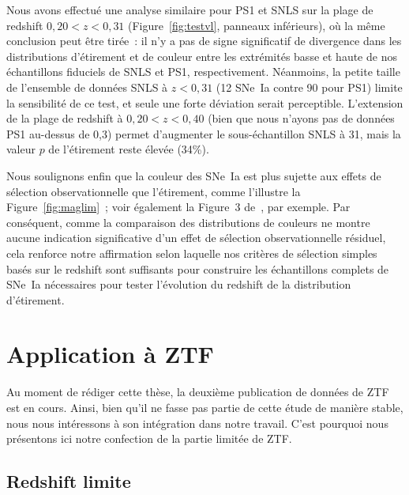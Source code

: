 \documentclass[../main/main.tex]{subfiles}
\begin{document}
Nous avons effectué une analyse similaire pour PS1 et SNLS sur la plage de
redshift $0,20 < z < 0,31$ (Figure~\ref{fig:testvl}, panneaux inférieurs), où la
même conclusion peut être tirée~: il n'y a pas de signe significatif de
divergence dans les distributions d'étirement et de couleur entre les extrémités
basse et haute de nos échantillons fiduciels de SNLS et PS1, respectivement.
Néanmoins, la petite taille de l'ensemble de données SNLS à $z < 0,31$ (12
SNe~Ia contre 90 pour PS1) limite la sensibilité de ce test, et seule une forte
déviation serait perceptible. L'extension de la plage de redshift à $0,20 < z <
0,40$ (bien que nous n'ayons pas de données PS1 au-dessus de 0,3) permet
d'augmenter le sous-échantillon SNLS à 31, mais la valeur $p$ de l'étirement
reste élevée (34\%).

Nous soulignons enfin que la couleur des SNe~Ia est plus sujette aux effets de
sélection observationnelle que l'étirement, comme l'illustre la
Figure~\ref{fig:maglim}~; voir également la Figure~3 de~\cite{kessler2017}, par
exemple. Par conséquent, comme la comparaison des distributions de couleurs ne
montre aucune indication significative d'un effet de sélection observationnelle
résiduel, cela renforce notre affirmation selon laquelle nos critères de
sélection simples basés sur le redshift sont suffisants pour construire les
échantillons complets de SNe~Ia nécessaires pour tester l'évolution du redshift
de la distribution d'étirement.

\section{Application à ZTF}\label{sec:ztfsam}
Au moment de rédiger cette thèse, la deuxième publication de données de ZTF est
en cours. Ainsi, bien qu'il ne fasse pas partie de cette étude de manière
stable, nous nous intéressons à son intégration dans notre travail. C'est
pourquoi nous présentons ici notre confection de la partie limitée de ZTF.

\subsection{Redshift limite}\label{ssec:ztflim}
\end{document}
